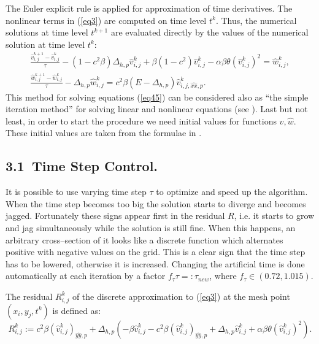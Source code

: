 \documentclass[leqno,11pt]{book}
\newcommand{\rf}[1]{(\ref{#1})}
\begin{document}
\par
The Euler explicit rule is applied for approximation of  time derivatives. The nonlinear terms in \rf{eq3} are computed on    time level $t^k$. Thus, the numerical solutions at time level $t^{k+1}$ are evaluated directly by the values of the numerical solution at time level $t^k$:  
 \begin{equation}\label{eq55}
 \begin{split}
   \frac {\widehat{v}_{i,j}^{k+1}-\widehat{v}_{i,j}^{k}}{\tau}- (1-c^2 \beta) \Delta_{h,p} \widehat{v} _{i,j}^{k}+ \beta (1-c^2     ) \widehat{v}_{i,j}^{k} - \alpha \beta \theta (\widehat{v}_{i,j}^{k})^2 = \widehat{w}_{i,j}^{k}, \\
  \frac  {\widehat{w}_{i,j}^{k+1} -\widehat{w}_{i,j}^{k}} {\tau} - \Delta_{h,p} \widehat{w}_{i,j}^{k} =  c^2 \beta (E- \Delta_{h,p})       
    \widehat{v}_{i,j,{\widehat{xx},p}}^{k}. \;\;\;\; \;\;\;\;\;\;\;\;\;\;\;\;
\end{split}
\end{equation}
This method for solving equations 
\rf{eq45} can be considered also as ``the simple iteration method'' for solving linear and nonlinear equations (see \cite{sam}).
Last but not least, in order to start the procedure we need initial values for functions $\widehat{v},\widehat{w}$. These initial values are taken from the formulae in \cite{Ch2011}.

\subsection{3.1~Time Step Control.}
It is possible to use varying time step $\tau$ to optimize and speed up the algorithm. When the time step becomes too big the solution starts to diverge and becomes jagged. Fortunately these signs appear first in the residual $R$,  i.e. it starts to grow and jag simultaneously while the solution is still fine. 
When this happens, an arbitrary cross--section of it looks like a discrete function which alternates positive with negative values on the grid.
This is a clear sign that the time step has to be lowered, otherwise it is increased. Changing the artificial time is done automatically at each iteration by a factor $f_{\tau}\tau =: \tau_{new}$, where $f_{\tau} \in (0.72, 1.015)$. 

The residual $R^k_{i,j}$ of the discrete approximation to \rf{eq3} at the mesh point $(x_i,y_j,t^k)$ is defined as:
\begin{equation}\label{residual}
R_{i,j}^k := 
c^2\beta (\widehat{v}^k_{i,j})_{\widehat{yy},p} + \Delta_{h,p}(-\beta \widehat{v}^k_{i,j} - c^2\beta (\widehat{v}^k_{i,j})_{\widehat{yy},p} + \Delta_{h,p} \widehat{v}^k_{i,j} 
+ \alpha \beta \theta (\widehat{v}^k_{i,j})^2  ).
\end{equation}
 
\end{document}
